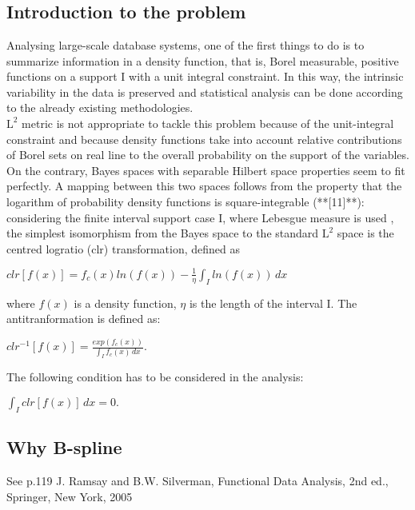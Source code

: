 \chapter{}
\newtheorem*{definition}{Definition}
\label{Introduzione}
\noindent 
\section{Introduction to the problem}
Analysing large-scale database systems, one of the first things to do is to summarize information in a density function, that is, Borel measurable, positive functions on a support I with a unit integral constraint. In this way, the intrinsic variability in the data is preserved and statistical analysis can be done according to the already existing methodologies. \\
$\text{L}^2$ metric is not appropriate to tackle this problem because of the unit-integral constraint and because density functions take into account relative contributions of Borel sets on real line to the overall probability on the support of the variables. \\
On the contrary, Bayes spaces with separable Hilbert space properties seem to fit perfectly. 
A mapping between this two spaces follows from the property that the logarithm of probability density functions is square-integrable (**[11]**): considering the finite interval support case I, where Lebesgue measure is used , the simplest isomorphism from the Bayes space to the standard $\text{L}^2$ space is  the centred logratio (clr) transformation, defined as 
\begin{center}
	\begin{math}
	clr[f(x)]= f_c(x) ln(f(x)) - \frac{1}{\eta}\int_{I} ln(f(x))\, dx
	\end{math}
\end{center}
where $f(x)$ is a density function, $\eta$ is the length of the interval I.
The antitranformation is defined as: 
\begin{center}
	\begin{math}
	clr^{-1}[f(x)]= \frac{exp(f_c(x))}{\int_{I} f_c(x)\, dx}.
	\end{math}
\end{center}
 The following condition has to be considered in the analysis:
 \begin{center}
 	\begin{math}
 	\int_{I} clr[f(x)]\, dx = 0.
 	\end{math}
 \end{center}

\section{Why B-spline }

See p.119 J. Ramsay and B.W. Silverman, Functional Data Analysis, 2nd ed., Springer, New York, 2005